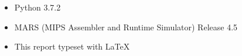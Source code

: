 \begin{itemize}
	\item Python 3.7.2
	\item MARS (MIPS Assembler and Runtime Simulator) Release 4.5
	\item This report typeset with \LaTeX
\end{itemize}